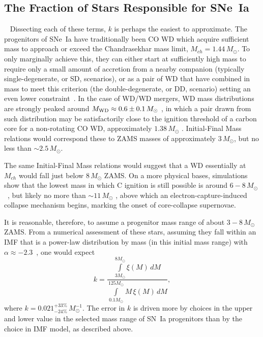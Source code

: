 \documentclass[apj]{aastex62}
\begin{document}
\subsection{The Fraction of Stars Responsible for SNe~Ia}~\label{sec:wds}
Dissecting each of these terms, $k$ is perhaps the easiest to approximate. The progenitors of SNe~Ia have traditionally been CO WD which acquire sufficient mass to approach or exceed the Chandrasekhar mass limit, $M_{ch}=1.44\,M_{\odot}$. To only marginally achieve this, they can either start at sufficiently high mass to require only a small amount of accretion from a nearby companion (typically single-degenerate, or SD, scenarios), or as a pair of WD that have combined in mass to meet this criterion (the double-degenerate, or DD, scenario) setting an even lower constraint~\cite[see][ for a review]{Maoz:2013}. In the case of WD/WD mergers, WD mass distributions are strongly peaked around $M_{\rm WD}\approx0.6\pm0.1\,M_{\odot}$ \citep{Catalan:2008il}, in which a pair drawn from such distribution may be satisfactorily close to the ignition threshold of a carbon core for a non-rotating CO WD, approximately $1.38\, M_{\odot}$ \citep{Arnett:1969dw, Nomoto:1982vh}. Initial-Final Mass relations \cite[e.g.,][]{Catalan:2008il,Cummings:2018oe} would correspond these to ZAMS masses of approximately $3\, M_{\odot}$, but no less than $\sim2.5\, M_{\odot}$. 

The same Initial-Final Mass relations would suggest that a WD essentially at $M_{ch}$ would fall just below $8\, M_{\odot}$ ZAMS. On a more physical bases, simulations show that the lowest mass in which C ignition is still possible is around $6-8 \,M_{\odot}$~\cite{Chen:2014rb,Denissenkov:2015rf}, but likely no more than $\sim11\, M_{\odot}$ \citep{Takahashi:2013jx}, above which an electron-capture-induced collapse mechanism begins, marking the onset of core-collapse supernovae.

It is reasonable, therefore, to assume a progenitor mass range of about $3-8\,M_{\odot}$ ZAMS. From a numerical assessment of these stars, assuming they fall within an IMF that is a power-law distribution by mass (in this initial mass range) with $\alpha\approx-2.3$~\citep{Salpeter:1955rw,Kroupa:2001gf}, one would expect 
\begin{equation}
k = \frac{\int\limits_{3M_{\odot}}^{8M_{\odot}} \xi(M)\,dM}{\int\limits_{0.1M_{\odot}}^{125M_{\odot}} M\,\xi(M)\,dM},
\end{equation}
\noindent where $k = 0.021^{+33\%}_{-24\%}\,M_{\odot}^{-1}$. The error in $k$ is driven more by choices in the upper and lower value in the selected mass range of  SN~Ia progenitors than by the choice in IMF model, as described above.
\end{document}
